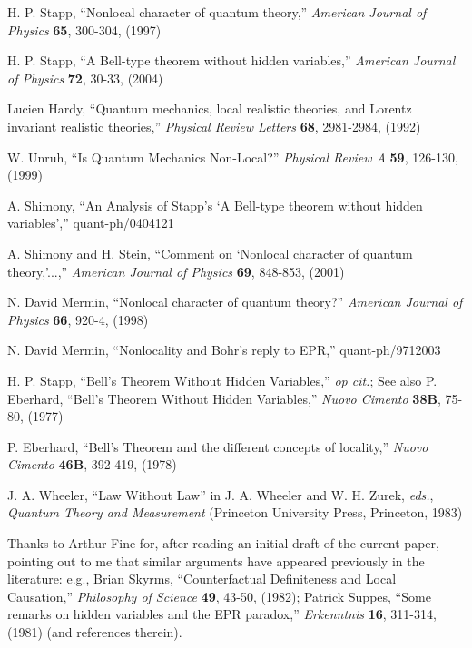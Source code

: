 \documentclass[aps,prc,onecolumn,12pt,nofootinbib]{revtex4-2}
\begin{document}
\begin{thebibliography}{00}
  H. P. Stapp, ``Nonlocal character of quantum
  theory,'' \emph{American Journal of Physics} {\bf{65}}, 300-304, (1997)

  H. P. Stapp, ``A Bell-type theorem without hidden
  variables,'' \emph{American Journal of Physics} {\bf{72}}, 30-33, (2004)

  Lucien Hardy, ``Quantum mechanics, local realistic
  theories, and Lorentz invariant realistic theories,''
  \emph{Physical Review Letters} {\bf{68}}, 2981-2984, (1992)

 W. Unruh, ``Is Quantum Mechanics Non-Local?''
  \emph{Physical Review A} {\bf{59}}, 126-130, (1999)

 A. Shimony, ``An Analysis of Stapp's `A Bell-type
  theorem without hidden variables','' quant-ph/0404121

  A. Shimony and H. Stein,
  ``Comment on `Nonlocal character of quantum theory,'...,''
  \emph{American Journal of Physics} {\bf{69}}, 848-853, (2001)

  N. David Mermin, ``Nonlocal character of quantum
  theory?'' \emph{American Journal of Physics} {\bf{66}}, 920-4, (1998)

  N. David Mermin, ``Nonlocality and Bohr's reply to
  EPR,'' quant-ph/9712003

 H. P. Stapp, ``Bell's Theorem Without Hidden
  Variables,'' \emph{op cit.}; See also P. Eberhard, ``Bell's Theorem
  Without Hidden Variables,'' \emph{Nuovo Cimento} {\bf{38B}}, 75-80, (1977)

  P. Eberhard, ``Bell's Theorem and the different
  concepts of locality,'' \emph{Nuovo Cimento} {\bf{46B}}, 392-419, (1978)

  J. A. Wheeler, ``Law Without Law'' in
  J. A. Wheeler and W. H. Zurek, \emph{eds.}, \emph{Quantum Theory and
  Measurement}  (Princeton University Press, Princeton, 1983)

 Thanks to Arthur Fine for, after reading an initial
  draft of the current paper, pointing out to me that similar arguments
  have appeared previously in the literature:  e.g., Brian Skyrms,
  ``Counterfactual Definiteness and Local Causation,'' \emph{Philosophy of
  Science} {\bf{49}}, 43-50, (1982); Patrick Suppes, ``Some remarks on hidden
  variables and the EPR paradox,'' \emph{Erkenntnis} {\bf{16}},
  311-314, (1981) (and references therein).


\end{thebibliography}
\end{document}
